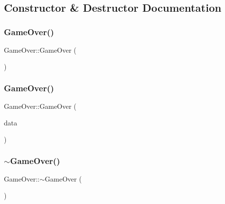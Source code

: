 \subsection{Constructor \& Destructor Documentation}
\mbox{\label{classGameOver_a191161f50e27feba1a5fd18aa867fbf2}} 
\subsubsection{\texorpdfstring{Game\+Over()}{GameOver()}\hspace{0.1cm}{\footnotesize\ttfamily [1/2]}}
{\footnotesize\ttfamily Game\+Over\+::\+Game\+Over (\begin{DoxyParamCaption}{ }\end{DoxyParamCaption})\hspace{0.3cm}{\ttfamily [delete]}}

\mbox{\label{classGameOver_a2ed53e8b1c1fe4e8e73d88fbb548da5a}} 
\subsubsection{\texorpdfstring{Game\+Over()}{GameOver()}\hspace{0.1cm}{\footnotesize\ttfamily [2/2]}}
{\footnotesize\ttfamily Game\+Over\+::\+Game\+Over (\begin{DoxyParamCaption}\item[{\mbox{\hyperlink{Game_8h_aff850703a7797c8bfee2f02906aec50c}{Game\+Data\+Ref}}}]{data }\end{DoxyParamCaption})}

\mbox{\label{classGameOver_ae36951a153d25d52fab7cbc7a85bbbbd}} 
\subsubsection{\texorpdfstring{$\sim$\+Game\+Over()}{~GameOver()}}
{\footnotesize\ttfamily Game\+Over\+::$\sim$\+Game\+Over (\begin{DoxyParamCaption}{ }\end{DoxyParamCaption})}



